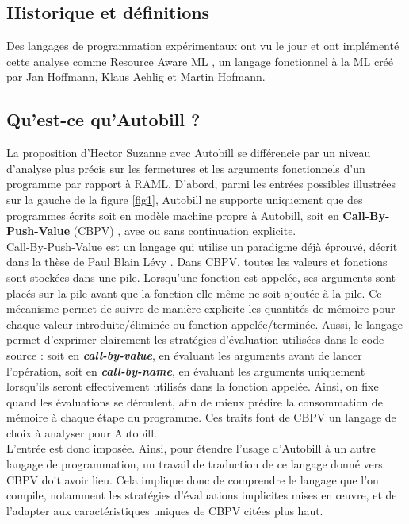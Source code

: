 \documentclass[12pt]{article}
\begin{document}
\pagebreak
\subsection{Historique et définitions}\label{historique-et-duxe9finitions}
Des langages de programmation expérimentaux ont vu le jour et ont implémenté cette analyse comme Resource Aware ML \cite{RAML}, un langage fonctionnel à la ML créé par Jan Hoffmann, Klaus Aehlig et Martin Hofmann.

\hypertarget{quest-ce-quautobill}{%
      \subsection{Qu'est-ce qu'Autobill ?}\label{quest-ce-quautobill}}

La proposition d'Hector Suzanne avec Autobill se différencie par un
niveau d'analyse plus précis sur les fermetures et les arguments
fonctionnels d'un programme par rapport à RAML. D'abord, parmi les entrées possibles
illustrées sur la gauche de la figure \ref{fig1}, Autobill ne supporte
uniquement que des programmes écrits soit en modèle machine propre à
Autobill, soit en \textbf{Call-By-Push-Value} (CBPV)
\cite{Levy}, avec ou sans continuation
explicite. \\

Call-By-Push-Value est un langage qui utilise un paradigme déjà éprouvé,
décrit dans la thèse de Paul Blain Lévy
\cite{Levy}. Dans CBPV, toutes les valeurs et fonctions sont stockées dans une pile. Lorsqu'une fonction est appelée, ses arguments sont placés sur la pile avant que la fonction elle-même ne soit ajoutée à la pile. Ce mécanisme permet de suivre de manière explicite les quantités de mémoire pour chaque valeur introduite/éliminée ou fonction appelée/terminée. Aussi,
le langage permet d'exprimer clairement les stratégies d'évaluation utilisées dans le code source : soit en \textbf{\textit{call-by-value}}, en évaluant les arguments avant de lancer l'opération, soit en \textbf{\textit{call-by-name}}, en évaluant les arguments uniquement lorsqu’ils seront effectivement utilisés dans la fonction appelée. Ainsi, on fixe quand les évaluations se déroulent, afin de mieux prédire la consommation de mémoire à chaque
étape du programme. Ces traits font de CBPV un langage de choix à analyser pour Autobill. \\

L'entrée est donc imposée. Ainsi, pour étendre l'usage d'Autobill à un
autre langage de programmation, un travail de traduction de ce langage
donné vers CBPV doit avoir lieu. Cela implique donc de comprendre le
langage que l'on compile, notamment les stratégies d'évaluations
implicites mises en œuvre, et de l'adapter aux caractéristiques uniques
de CBPV citées plus haut. \\
\end{document}
